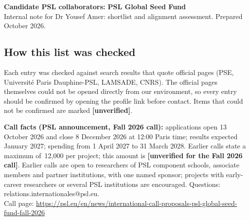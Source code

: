 \documentclass[10pt]{article}
\begin{document}
{\Large\bfseries Candidate PSL collaborators: PSL Global Seed Fund}\\[2pt]
{\small Internal note for Dr Yousef Amer: shortlist and alignment assessment. Prepared October 2026.}

\subsection*{How this list was checked}
Each entry was checked against search results that quote official pages (PSE,
Universit\'e Paris Dauphine-PSL, LAMSADE, CNRS). The official pages themselves could
not be opened directly from our environment, so every entry should be confirmed by
opening the profile link before contact. Items that could not be confirmed are marked
\textbf{[unverified]}.

\textbf{Call facts (PSL announcement, Fall 2026 call):} applications open 13 October 2026
and close 8 December 2026 at 12:00 Paris time; results expected January 2027; spending
from 1 April 2027 to 31 March 2028. Earlier calls state a maximum of \texteuro\,12{,}000 per
project; this amount is \textbf{[unverified for the Fall 2026 call]}. Earlier calls are
open to researchers of PSL component schools, associate members and partner
institutions, with one named sponsor; projects with early-career researchers or several
PSL institutions are encouraged. Questions: relations.internationales@psl.eu.\\
Call page: \url{https://psl.eu/en/news/international-call-proposals-psl-global-seed-fund-fall-2026}
\end{document}
